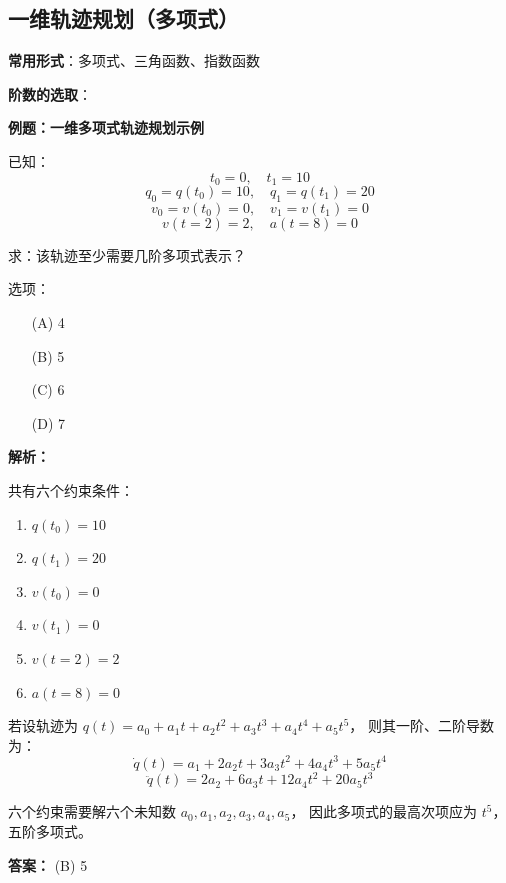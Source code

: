 \documentclass[../main.tex]{subfiles}
\begin{document}

\subsection{一维轨迹规划（多项式）}\label{sec:1d-poly}
\textbf{常用形式}：多项式、三角函数、指数函数

\textbf{阶数的选取}：\\
    {\small\kaishu
    \textbf{例题：一维多项式轨迹规划示例}
    
    已知：
    \[
    t_0 = 0, \quad t_1 = 10
    \]
    \[
    q_0 = q(t_0) = 10, \quad q_1 = q(t_1) = 20
    \]
    \[
    v_0 = v(t_0) = 0, \quad v_1 = v(t_1) = 0
    \]
    \[
    v(t=2) = 2, \quad a(t=8) = 0
    \]
    
    求：该轨迹至少需要几阶多项式表示？
    
    选项：
    \begin{itemize}
        \item[(A)] 4
        \item[(B)] 5
        \item[(C)] 6
        \item[(D)] 7
    \end{itemize}
    
    \vspace{1em}
    \textbf{解析：}
    
    共有六个约束条件：
    \begin{enumerate}
        \item $q(t_0) = 10$
        \item $q(t_1) = 20$
        \item $v(t_0) = 0$
        \item $v(t_1) = 0$
        \item $v(t=2) = 2$
        \item $a(t=8) = 0$
    \end{enumerate}
    
    若设轨迹为 $q(t) = a_0 + a_1 t + a_2 t^2 + a_3 t^3 + a_4 t^4 + a_5 t^5$，  
    则其一阶、二阶导数为：
    \[
    \dot{q}(t) = a_1 + 2a_2 t + 3a_3 t^2 + 4a_4 t^3 + 5a_5 t^4
    \]
    \[
    \ddot{q}(t) = 2a_2 + 6a_3 t + 12a_4 t^2 + 20a_5 t^3
    \]
    
    六个约束需要解六个未知数 $a_0,a_1,a_2,a_3,a_4,a_5$，  
    因此多项式的最高次项应为 $t^5$，五阶多项式。
    
    \vspace{0.5em}
    \textbf{答案：} (B) 5
    }
\end{document}
